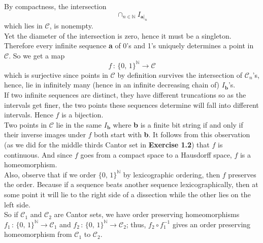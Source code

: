 \documentclass[a4paper,11pt]{article}
\begin{document}
By compactness, the intersection
	$$\cap_{n \in \mathbb{N}} I_{\textbf{a}|_n}$$
which lies in $\mathcal{C}$, is nonempty.\\

Yet the diameter of the intersection is zero, hence it must be a singleton. Therefore every infinite sequence \textbf{a} of 0’s and 1’s uniquely determines a point in $\mathcal{C}$. So we get a map
	$$f\,:\,\{0,\,1\}^{\mathbb{N}} \to \mathcal{C}$$
which is surjective since points in $\mathcal{C}$ by definition survives the intersection of $\mathcal{C}_n$’s, hence, lie in infinitely many (hence in an infinite decreasing chain of) $I_{\textbf{b}}$’s.\\

If two infinite sequences are distinct, they have different truncations so as the intervals get finer, the two points these sequences determine will fall into different intervals. Hence $f$ is a bijection.\\

Two points in $\mathcal{C}$ lie in the same $I_{\textbf{b}}$ where \textbf{b} is a finite bit string if and only if their inverse images under $f$ both start with \textbf{b}. It follows from this observation (as we did for the middle thirds Cantor set in \textbf{Exercise 1.2}) that $f$ is continuous. And since $f$ goes from a compact space to a Hausdorff space, $f$ is a homeomorphism.\\

Also, observe that if we order $\{0,\,1\}^{\mathbb{N}}$ by lexicographic ordering, then $f$ preserves the order. Because if a sequence beats another sequence lexicographically, then at some point it will lie to the right side of a dissection while the other lies on the left side.\\

So if $\mathcal{C}_1$ and $\mathcal{C}_2$ are Cantor sets, we have order preserving homeomorphisms $f_1\,:\,\{0,\,1\}^{\mathbb{N}} \to \mathcal{C}_1$ and $f_2\,:\,\{0,\,1\}^{\mathbb{N}} \to \mathcal{C}_2$; thus, $f_2 \circ f_1^{-1}$ gives an order preserving homeomorphism from $\mathcal{C}_1$ to $\mathcal{C}_2$.\\\\\\



\end{document}
